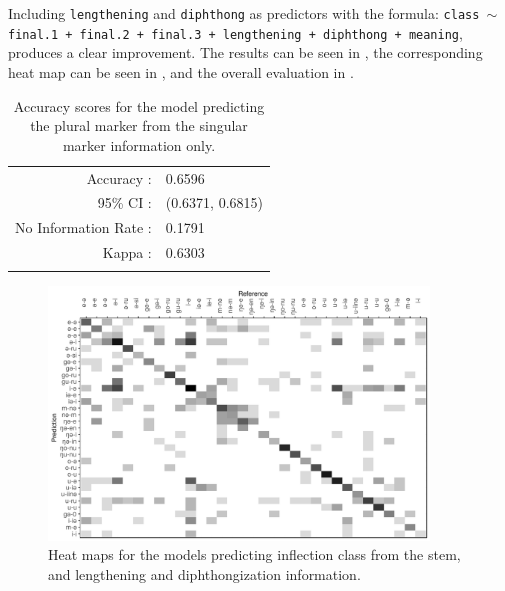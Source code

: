 Including \texttt{lengthening} and \texttt{diphthong} as predictors with the formula: \texttt{class $\sim$ final.1 + final.2 + final.3 + lengthening + diphthong + meaning}, produces a clear improvement. The results can be seen in , the corresponding heat map can be seen in , and the overall evaluation in .

\begin{table}[!htpb]
  \centering
  \begin{tabular}{rl}
    \lsptoprule
    \multicolumn{2}{c}{Overall Statistics}  \\
    \midrule
    Accuracy :& 0.6596\\
    95\% CI :& (0.6371, 0.6815)\\
    No Information Rate :& 0.1791\\
    Kappa :& 0.6303\\
    \lspbottomrule
  \end{tabular}
  \caption{Accuracy scores for the model predicting the plural marker from the singular marker information only.}\label{tab:class-marker-dplengthstem}
\end{table}

\begin{figure}[!htpb]
  \centering
  \includegraphics[width=0.9\textwidth]{./figures/kasem/p-class-sg-cm-2.pdf}
  \caption{Heat maps for the models predicting inflection class from the stem, and lengthening and diphthongization information.}\label{fig:cm-class-sg-2}
\end{figure}

